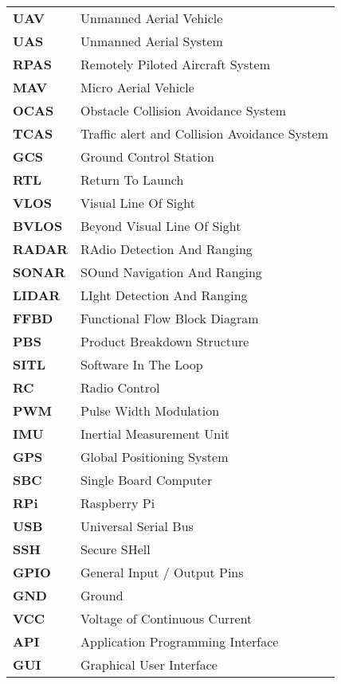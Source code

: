	\begin{tabular}{>{\bf}l @{\hspace{1cm}} l}
			\rowcolor{white}
		UAV		&	Unmanned Aerial Vehicle	\\
        UAS		&	Unmanned Aerial System	\\
			\rowcolor{white}
        RPAS	&	Remotely Piloted Aircraft System	\\
        MAV		&	Micro Aerial Vehicle	\\
			\rowcolor{white}
        OCAS	&	Obstacle Collision Avoidance System	\\
        TCAS	&	Traffic alert and Collision Avoidance System	\\
			\rowcolor{white}
        GCS		&	Ground Control Station	\\
        RTL		&	Return To Launch	\\
			\rowcolor{white}
        VLOS	&	Visual Line Of Sight	\\
        BVLOS	&	Beyond Visual Line Of Sight	\\
			\rowcolor{white}
        RADAR	&	RAdio Detection And Ranging	\\
        SONAR	&	SOund Navigation And Ranging	\\
			\rowcolor{white}
        LIDAR	&	LIght Detection And Ranging	\\
        FFBD	&	Functional Flow Block Diagram	\\
			\rowcolor{white}
        PBS		&	Product Breakdown Structure	\\
        SITL	&	Software In The Loop	\\
			\rowcolor{white}
        RC		&	Radio Control	\\
        PWM		&	Pulse Width Modulation	\\
			\rowcolor{white}
        IMU		&	Inertial Measurement Unit	\\
        GPS		&	Global Positioning System	\\
			\rowcolor{white}
        SBC		&	Single Board Computer	\\
        RPi		&	Raspberry Pi	\\
			\rowcolor{white}
        USB		&	Universal Serial Bus	\\
        SSH		&	Secure SHell	\\
			\rowcolor{white}
        GPIO	&	General Input / Output Pins	\\
        GND		&	Ground	\\
			\rowcolor{white}
        VCC		&	Voltage of Continuous Current	\\
        API		&	Application Programming Interface	\\
			\rowcolor{white}
        GUI		&	Graphical User Interface	\\
	\end{tabular}
